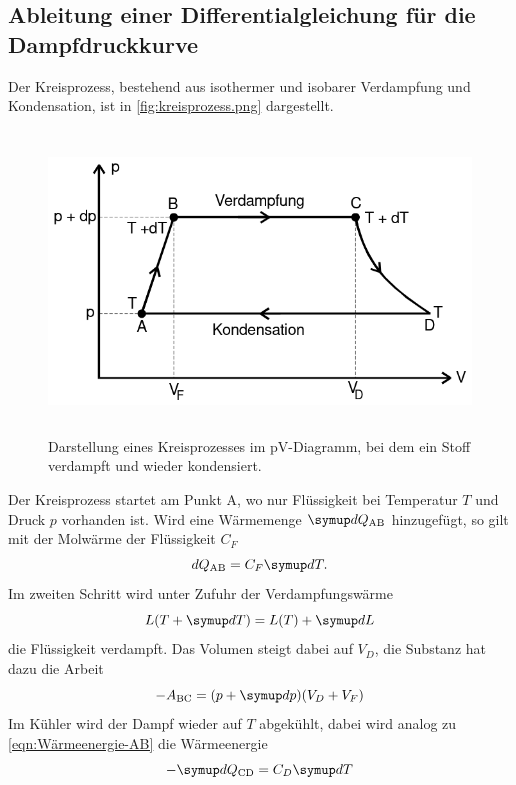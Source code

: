 \subsection{Ableitung einer Differentialgleichung für die Dampfdruckkurve}
\label{sec:Ableitung einer Differentialgleichung für die Dampfdruckkurve}
Der Kreisprozess, bestehend aus isothermer und isobarer Verdampfung und Kondensation, ist
in \autoref{fig:kreisprozess.png} dargestellt.
\begin{figure}
	\centering
	\includegraphics[height=8cm]{images/kreisprozess.png}
	\caption{Darstellung eines Kreisprozesses im pV-Diagramm, bei dem ein Stoff verdampft und wieder
	kondensiert. \cite{anleitung}}
	\label{fig:kreisprozess.png}
\end{figure}
Der Kreisprozess startet am Punkt A, wo nur Flüssigkeit bei Temperatur $T$ und Druck $p$
vorhanden ist. Wird eine Wärmemenge $\symup dQ_\text{AB}$ hinzugefügt, so gilt mit der Molwärme
der Flüssigkeit $C_F$ 
\begin{equation}
	dQ_\text{AB} = C_F \symup dT.
	\label{eqn:Wärmeenergie-AB}
\end{equation}
Im zweiten Schritt wird unter Zufuhr der Verdampfungswärme
\begin{equation}
	L(T + \symup dT) = L(T) + \symup dL
\end{equation}
die Flüssigkeit verdampft. Das Volumen steigt dabei auf $V_D$, die Substanz hat dazu die
Arbeit
\begin{equation}
	-A_\text{BC} = (p + \symup dp)(V_D + V_F)
	\label{eqn:Kreisprozess-AB}
\end{equation}
Im Kühler wird der Dampf wieder auf $T$ abgekühlt, dabei wird analog zu \autoref{eqn:Wärmeenergie-AB}
die Wärmeenergie 
\begin{equation}
	-\symup dQ_\text{CD} = C_D \symup dT
\end{equation}
